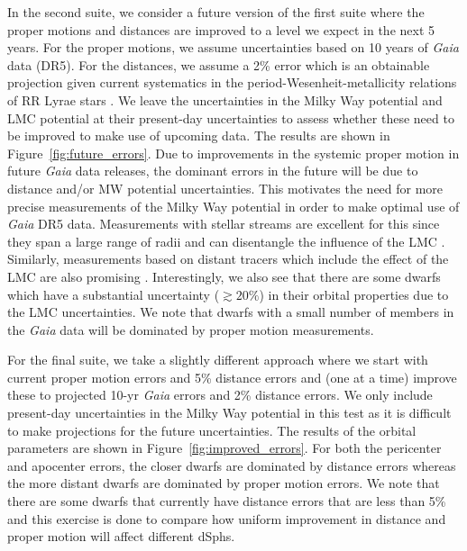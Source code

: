 \documentclass[twocolumn]{aastex63}
\begin{document}
In the second suite, we consider a future version of the first suite where the proper motions and distances are improved to a level we expect in the next 
5 years. For the proper motions, we assume uncertainties based on 10 years of \textit{Gaia} data (DR5). For the distances, we assume a 2\% error which is an obtainable projection given current systematics in the period-Wesenheit-metallicity relations of RR Lyrae stars \citep[e.g.,][]{Nagarajan2021arXiv211106899N, Garofalo2022arXiv220307435G}. We leave the uncertainties in the Milky Way potential and LMC potential at their present-day uncertainties to assess whether these need to be improved to make use of  upcoming data. The  results are shown in Figure~\ref{fig:future_errors}.
Due to improvements in the systemic proper motion in future {\it Gaia} data releases, the dominant errors in the future will be due to distance and/or MW potential uncertainties. This motivates the need for more precise measurements of the Milky Way potential in order to make optimal use of {\it Gaia} DR5 data. {Measurements with stellar streams are excellent for this since they span a large range of radii and can disentangle the influence of the LMC \citep[e.g.][]{Kupper2015ApJ...803...80K,Erkal2019MNRAS.487.2685E,Vasiliev2021MNRAS.501.2279V}. Similarly, measurements based on distant tracers which include the effect of the LMC are also promising \citep[e.g.][]{Deason2021MNRAS.501.5964D,CorreaMagnus2022MNRAS.511.2610C}.} Interestingly, we also see that there are some dwarfs which have a substantial uncertainty ($\gtrsim 20\%$) in their orbital properties due to the LMC uncertainties. We note that dwarfs with a small number of members in the {\it Gaia} data will be dominated by proper motion measurements. 

For the final suite, we take a slightly different approach where we start with current proper motion errors and 5\% distance errors and (one at a time) improve these to projected 10-yr {\it Gaia} errors and 2\% distance errors. 
We only include present-day uncertainties in the Milky Way potential in this test as it is difficult to make projections for the future uncertainties.
The results of the orbital parameters are shown in Figure~\ref{fig:improved_errors}.
For both the pericenter and apocenter errors, the closer dwarfs are dominated by distance errors whereas the more distant dwarfs are dominated by proper motion errors. 
We note that there are some dwarfs that currently have distance errors that are less than 5\% and this exercise is done to compare how uniform improvement in distance and proper motion will affect different dSphs.
\end{document}
